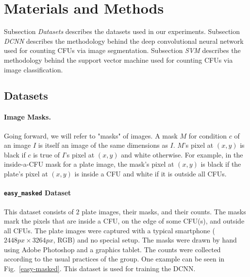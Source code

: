 \documentclass[10pt,letterpaper]{article}
\begin{document}
\section*{Materials and Methods}
    Subsection \textit{Datasets} describes the datasets used in our experiments. Subsection \textit{DCNN} describes the methodology behind the deep convolutional neural network used for counting CFUs via image segmentation. Subsection \textit{SVM} describes the methodology behind the support vector machine used for counting CFUs via image classification.
    
    \subsection*{Datasets} \label{ssec:datasets}
        \paragraph*{Image Masks.}
            Going forward, we will refer to "masks" of images. A mask $M$ for condition $c$ of an image $I$ is itself an image of the same dimensions as $I$. $M$'s pixel at $(x, y)$ is black if $c$ is true of $I$'s pixel at $(x, y)$ and white otherwise. For example, in the inside-a-CFU mask for a plate image, the mask's pixel at $(x, y)$ is black if the plate's pixel at $(x, y)$ is inside a CFU and white if it is outside all CFUs.

        \paragraph*{\texttt{easy\_masked} Dataset}
            This dataset consists of $2$ plate images, their masks, and their counts. The masks mark the pixels that are inside a CFU, on the edge of some CFU(s), and outside all CFUs. The plate images were captured with a typical smartphone ($2448px \times 3264px$, RGB) and no special setup. The masks were drawn by hand using Adobe Photoshop and a graphics tablet. The counts were collected according to the usual practices of the group. One example can be seen in Fig.~\ref{easy-masked}. This dataset is used for training the DCNN.
\end{document}
